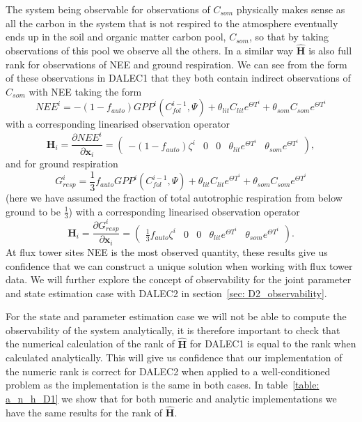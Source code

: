 \documentclass[11pt]{article}
\begin{document}
The system being observable for observations of $C_{som}$ physically makes sense as all the carbon in the system that is not respired to the atmosphere eventually ends up in the soil and organic matter carbon pool, $C_{som}$, so that by taking observations of this pool we observe all the others. In a similar way $\hat{\textbf{H}}$ is also full rank for observations of NEE and ground respiration. We can see from the form of these observations in DALEC1 that they both contain indirect observations of $C_{som}$ with NEE taking the form
\begin{equation}
NEE^{i}=-(1-f_{auto})GPP^{i}(C_{fol}^{i-1}, \Psi) + \theta_{lit}C_{lit} e^{\Theta T^{i}} + \theta_{som}C_{som} e^{\Theta T^{i}} \label{eqn: D1_nee}
\end{equation}
with a corresponding linearised observation operator
\begin{equation}
\textbf{H}_{i} = \frac{\partial NEE^{i}}{\partial \textbf{x}_{i}} =
\begin{pmatrix}
-(1-f_{auto})\zeta^i & 0 & 0 & \theta_{lit} e^{\Theta T^{i}} & \theta_{som} e^{\Theta T^{i}}
\end{pmatrix},
\end{equation}
and for ground respiration
\begin{equation}
G_{resp}^{i}=\frac{1}{3}f_{auto}GPP^{i}(C_{fol}^{i-1}, \Psi) + \theta_{lit}C_{lit} e^{\Theta T^{i}} + \theta_{som}C_{som} e^{\Theta T^{i}} \label{neeeqn}
\end{equation}
(here we have assumed the fraction of total autotrophic respiration from below ground to be $\frac{1}{3}$) with a corresponding linearised observation operator
\begin{equation}
\textbf{H}_{i} = \frac{\partial G_{resp}^{i}}{\partial \textbf{x}_{i}} =
\begin{pmatrix}
\frac{1}{3}f_{auto}\zeta^i & 0 & 0 & \theta_{lit} e^{\Theta T^{i}} & \theta_{som} e^{\Theta T^{i}}
\end{pmatrix}.
\end{equation}
At flux tower sites NEE is the most observed quantity, these results give us confidence that we can construct a unique solution when working with flux tower data. We will further explore the concept of observability for the joint parameter and state estimation case with DALEC2 in section~\ref{sec: D2_observability}. 

For the state and parameter estimation case we will not be able to compute the observability of the system analytically, it is therefore important to check that the numerical calculation of the rank of $\hat{\textbf{H}}$ for DALEC1 is equal to the rank when calculated analytically. This will give us confidence that our implementation of the numeric rank is correct for DALEC2 when applied to a well-conditioned problem as the implementation is the same in both cases. In table~\ref{table: a_n_h_D1} we show that for both numeric and analytic implementations we have the same results for the rank of $\hat{\textbf{H}}$.
\end{document}

